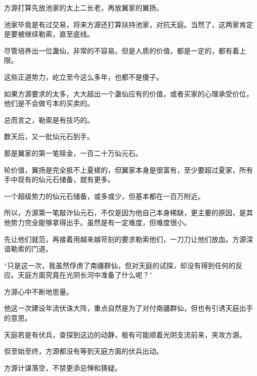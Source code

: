 \begin{this_body}
方源打算先放池家的太上二长老，再放翼家的翼扬。

池家毕竟是有过交易，将来方源还打算扶持池家，对抗天庭。当然了，这两家肯定是要被继续勒索，直至底线。

尽管培养出一位蛊仙，非常的不容易。但是人质的价值，都是一定的，都有着上限。

这些正道势力，屹立至今这么多年，也都不是傻子。

如果方源要求的太多，大大超出一个蛊仙应有的价值，或者买家的心理承受价位，他们是不会做亏本的买卖的。

总而言之，勒索是有技巧的。

数天后，又一批仙元石到手。

那是翼家的第一笔赎金，一百二十万仙元石。

轮价值，翼扬是完全抵不上夏槎的，但翼家本身是很富有，至少要超过夏家，所有手中现有的仙元石储备，就有更多。

一个超级势力的仙元石储备，或多或少，但基本都在一百万附近。

所以，方源第一笔敲诈仙元石，不仅是因为他自己本身稀缺，更主要的原因，是其他势力完全能够拿得出手。虽然是有一定难度，但难度很小。

先让他们就范，再接着用越来越苛刻的要求勒索他们，一刀刀让他们放血。方源深谙勒索的门道。

“只是这一次，我虽然俘虏了南疆群仙，但对天庭的试探，却没有得到任何的反应。天庭方面究竟在光阴长河中准备了什么呢？”

方源心中不断地思量。

他这一次建设年流伏诛大阵，重点自然是为了对付南疆群仙，但也有引诱天庭出手的意思。

天庭若是有伏兵，查探到这边的动静，极有可能顺着光阴支流前来，夹攻方源。

但至始至终，方源都没有等到天庭方面的伏兵出动。

方源计谋落空，不禁更添忌惮和猜疑。

\end{this_body}

